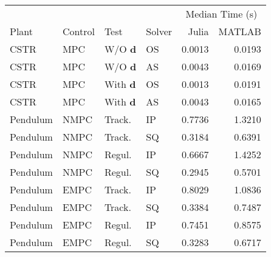 \begin{tabular}{llllrr}
	
\toprule %

	  &	& & & \multicolumn{2}{c}{Median Time (s)} \\ \cmidrule(l){5-6}
Plant & Control & Test & Solver & Julia & MATLAB \\
\midrule %

CSTR		& MPC	& W/O $\mathbf{d}$	& OS & \num{0.0013} & \num{0.0193}	\\
CSTR		& MPC	& W/O $\mathbf{d}$	& AS & \num{0.0043} & \num{0.0169}	\\
CSTR		& MPC	& With $\mathbf{d}$ & OS & \num{0.0013} & \num{0.0191}	\\
CSTR		& MPC	& With $\mathbf{d}$ & AS & \num{0.0043} & \num{0.0165}	\\
Pendulum 	& NMPC	& Track. 	   		& IP & \num{0.7736} & \num{1.3210}	\\
Pendulum 	& NMPC	& Track. 	   		& SQ & \num{0.3184} & \num{0.6391}	\\
Pendulum    & NMPC	& Regul. 			& IP & \num{0.6667} & \num{1.4252} 	\\
Pendulum    & NMPC	& Regul. 			& SQ & \num{0.2945} & \num{0.5701} 	\\
Pendulum    & EMPC	& Track.			& IP & \num{0.8029} & \num{1.0836} 	\\
Pendulum    & EMPC	& Track.			& SQ & \num{0.3384} & \num{0.7487} 	\\
Pendulum	& EMPC	& Regul. 			& IP & \num{0.7451} & \num{0.8575} 	\\
Pendulum	& EMPC	& Regul. 			& SQ & \num{0.3283} & \num{0.6717}  \\
	
\bottomrule %
	
\end{tabular}